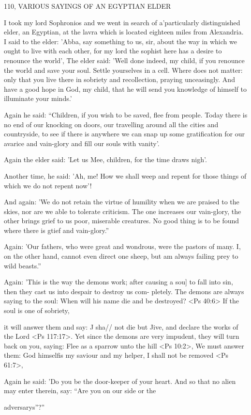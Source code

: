 110, VARIOUS SAYINGS OF AN EGYPTIAN ELDER

I took my lord Sophronios and we went in search of a'particularly
distinguished elder, an Egyptian, at the lavra which is located
eighteen miles from Alexandria. I said to the elder: 'Abba, say
something to us, sir, about the way in which we ought to live with
each other, for my lord the sophist here has a desire to renounce the
world', The elder said: 'Well done indeed, my child, if you renounce
the world and save your soul. Settle yourselves in a cell. Where does
not matter: only that you live there in sobriety and recollection,
praying unceasingly. And have a good hope in God, my child, that
he will send you knowledge of himself to illuminate your minds.'

Again he said: “Children, if you wish to be saved, flee from
people. Today there is no end of our knocking on doors, our
travelling around all the cities and countryside, to see if there is
anywhere we can snap up some gratification for our avarice and
vain-glory and fill our souls with vanity'.

Again the elder said: 'Let us Mee, children, for the time draws
nigh'.

Another time, he said: 'Ah, me! How we shall weep and repent
for those things of which we do not repent now'!

And again: 'We do not retain the virtue of humility when we
are praised to the skies, nor are we able to tolerate criticism. The
one increases our vain-glory, the other brings grief to us poor,
miserable creatures. No good thing is to be found where there is
gtief and vain-glory.”

Again: 'Our fathers, who were great and wondrous, were the
pastors of many. I, on the other hand, cannot even direct one sheep,
but am always failing prey to wild beasts.”

Again: 'This is the way the demons work; after causing a sou]
to fall into sin, then they cast us into despair to destroy us com-
pletely. The demons are always saying to the soul: When will his
name die and be destroyed? <Ps 40:6> If the soul is one of sobriety,

it will answer them and say: J sha// not die but Jive, and declare the
works of the Lord <Ps 117:17>. Yet since the demons are very
impudent, they will turn back on you, saying: Flee as a sparrow
unto the hill <Ps 10:2>, We must answer them: God himselfis my
saviour and my helper, I shall not be removed <Ps 61:7>,

Again he said: 'Do you be the door-keeper of your heart. And
so that no alien may enter therein, say: “Are you on our side or the

adversary\textquotesingle s”?”

